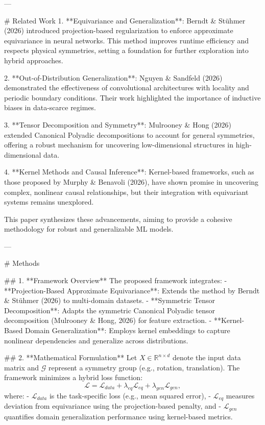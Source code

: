 ---

# Related Work
1. **Equivariance and Generalization**: Berndt & Stühmer (2026) introduced projection-based regularization to enforce approximate equivariance in neural networks. This method improves runtime efficiency and respects physical symmetries, setting a foundation for further exploration into hybrid approaches.
   
2. **Out-of-Distribution Generalization**: Nguyen & Sandfeld (2026) demonstrated the effectiveness of convolutional architectures with locality and periodic boundary conditions. Their work highlighted the importance of inductive biases in data-scarce regimes.

3. **Tensor Decomposition and Symmetry**: Mulrooney & Hong (2026) extended Canonical Polyadic decompositions to account for general symmetries, offering a robust mechanism for uncovering low-dimensional structures in high-dimensional data.

4. **Kernel Methods and Causal Inference**: Kernel-based frameworks, such as those proposed by Murphy & Benavoli (2026), have shown promise in uncovering complex, nonlinear causal relationships, but their integration with equivariant systems remains unexplored.

This paper synthesizes these advancements, aiming to provide a cohesive methodology for robust and generalizable ML models.

---

# Methods

## 1. **Framework Overview**
The proposed framework integrates:
- **Projection-Based Approximate Equivariance**: Extends the method by Berndt & Stühmer (2026) to multi-domain datasets.
- **Symmetric Tensor Decomposition**: Adapts the symmetric Canonical Polyadic tensor decomposition (Mulrooney & Hong, 2026) for feature extraction.
- **Kernel-Based Domain Generalization**: Employs kernel embeddings to capture nonlinear dependencies and generalize across distributions.

## 2. **Mathematical Formulation**
Let \( X \in \mathbb{R}^{n \times d} \) denote the input data matrix and \( \mathcal{G} \) represent a symmetry group (e.g., rotation, translation). The framework minimizes a hybrid loss function:
\[
\mathcal{L} = \mathcal{L}_{data} + \lambda_{eq} \mathcal{L}_{eq} + \lambda_{gen} \mathcal{L}_{gen},
\]
where:
- \( \mathcal{L}_{data} \) is the task-specific loss (e.g., mean squared error),
- \( \mathcal{L}_{eq} \) measures deviation from equivariance using the projection-based penalty, and
- \( \mathcal{L}_{gen} \) quantifies domain generalization performance using kernel-based metrics.

